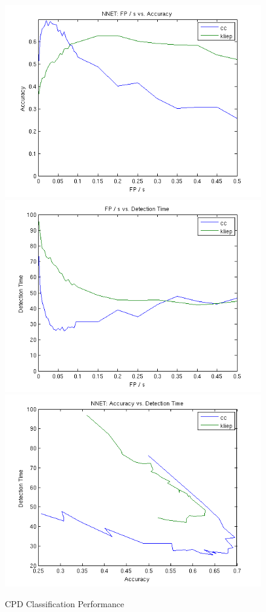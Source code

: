 \documentclass[onehalf,11pt]{beavtex}
\begin{document}
\begin{figure}
 \includegraphics[scale=0.3]{nnet_fpr_acc.png}
 \includegraphics[scale=0.3]{nnet_fpr_det.png}
 \includegraphics[scale=0.3]{nnet_acc_det.png}
 \caption{CPD Classification Performance}
\end{figure}
\end{document}
